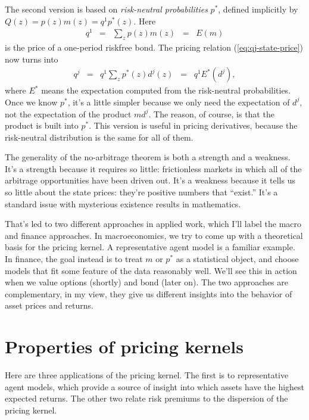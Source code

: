 \documentclass[11pt]{article}
\begin{document}
The second version is based on
{\it risk-neutral probabilities\/} $p^*$,
defined implicitly by $ Q(z) = p(z) m(z) = q^1 p^*(z)$.
Here
\begin{eqnarray*}
    q^1 &=& \sum_z p(z) m(z) \;\;=\;\; E(m)
\end{eqnarray*}
is the price of a one-period riskfree bond.
The pricing relation (\ref{eq:qj-state-price}) now turns into
\begin{eqnarray}
    q^j &=& q^1 \sum_z p^*(z) d^j(z)  \;\;=\;\; q^1 E^* (d^j) ,
    \label{eq:q=Estar-d}
\end{eqnarray}
where $E^*$ means the expectation computed from the risk-neutral probabilities.
Once we know $p^*$, it's a little simpler because we only need the
expectation of $d^j$, not the expectation of the product $m d^j$.
The reason, of course, is that the product is built into $p^*$.
This version is useful in pricing derivatives,
because the risk-neutral distribution is the same for all of them.

The generality of the no-arbitrage theorem is both a strength 
and a weakness.  
It's a strength because it requires so little:  frictionless
markets in which all of the arbitrage opportunities have been driven out.  
It's a weakness because it tells us so little about the state prices:
they're positive numbers that ``exist.''
It's a standard issue with mysterious existence results in mathematics.  

That's led to two different approaches in applied work, 
which I'll label the macro and finance approaches.  
In macroeconomics, we try to come up with a theoretical basis for the pricing kernel.
A representative agent model is a familiar example.
In finance, the goal instead is to treat $m$ or $p^*$ as a statistical object, 
and choose models that fit some feature of the data reasonably 
well.
We'll see this in action when we value options (shortly) and bond (later on).  
The two approaches are complementary, in my view, they give us different 
insights into the behavior of asset prices and returns. 


\section{Properties of pricing kernels}

Here are three applications of the pricing kernel.
The first is to representative agent models,
which provide a source of insight into which assets have
the highest expected returns.
The other two relate risk premiums to the dispersion of the pricing kernel.
\end{document}
